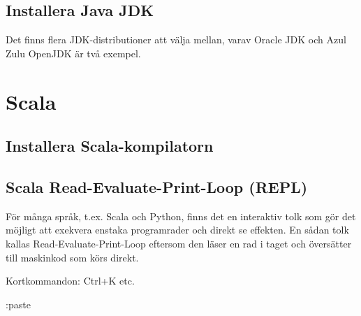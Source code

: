 \subsection{Installera Java JDK}

Det finns flera JDK-distributioner att välja mellan, varav Oracle JDK och Azul Zulu OpenJDK är två exempel.   

\section{Scala}

\subsection{Installera Scala-kompilatorn}

\subsection{Scala Read-Evaluate-Print-Loop (REPL)}\label{appendix:compile:REPL}

För många språk, t.ex. Scala och Python, finns det en interaktiv tolk som gör det möjligt att exekvera enstaka programrader och direkt se effekten. En sådan tolk kallas Read-Evaluate-Print-Loop eftersom den läser en rad i taget och översätter till maskinkod som körs direkt.    

\TODO Kortkommandon: Ctrl+K etc.

\TODO :paste


